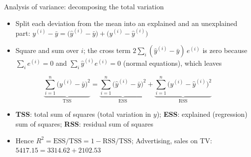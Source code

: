 \begin{frame}{Analysis of variance: decomposing the total variation}
    \begin{itemize}
        \item Split each deviation from the mean into an explained and an unexplained part: $y^{(i)} - \bar{y} = \big(\hat{y}^{(i)} - \bar{y}\big) + \big(y^{(i)} - \hat{y}^{(i)}\big)$
        \item Square and sum over $i$; the cross term $2 \sum_i (\hat{y}^{(i)} - \bar{y})\, e^{(i)}$ is zero because $\sum_i e^{(i)} = 0$ and $\sum_i \hat{y}^{(i)} e^{(i)} = 0$ (normal equations), which leaves
    \end{itemize}
    \[
        \underbrace{\sum_{i=1}^{n} \big(y^{(i)} - \bar{y}\big)^2}_{\mathrm{TSS}} = \underbrace{\sum_{i=1}^{n} \big(\hat{y}^{(i)} - \bar{y}\big)^2}_{\mathrm{ESS}} + \underbrace{\sum_{i=1}^{n} \big(y^{(i)} - \hat{y}^{(i)}\big)^2}_{\mathrm{RSS}}
    \]
    \begin{itemize}
        \item \textbf{TSS}: total sum of squares (total variation in $y$); \textbf{ESS}: explained (regression) sum of squares; \textbf{RSS}: residual sum of squares
        \item Hence $R^2 = \mathrm{ESS}/\mathrm{TSS} = 1 - \mathrm{RSS}/\mathrm{TSS}$; Advertising, sales on TV: $5417.15 = 3314.62 + 2102.53$
    \end{itemize}
\end{frame}






